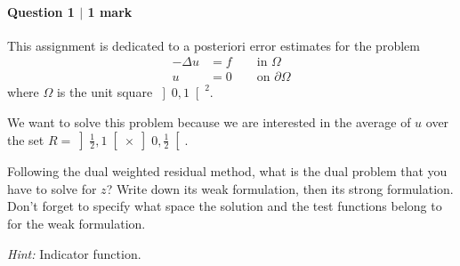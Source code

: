 \paragraph*{Question 1 $\vert$ 1 mark}%

This assignment is dedicated to a posteriori error estimates for the problem
\begin{equation}\tag{P}\label{eq:primal}
\begin{aligned}
-\Delta u &= f \qquad \text{in } \Omega\\
u &= 0 \qquad \text{on } \partial\Omega
\end{aligned}
\end{equation}
where $\Omega$ is the unit square $\left]0,1\right[^2$.

We want to solve this problem because we are interested in the average of $u$ over the set $R = \left]\frac{1}{2},1\right[ \times \left] 0,\frac{1}{2}\right[$.

Following the dual weighted residual method, what is the dual problem that you have to solve for $z$? Write down its weak formulation, then its strong formulation. Don't forget to specify what space the solution and the test functions belong to for the weak formulation.

\emph{Hint:} Indicator function.

